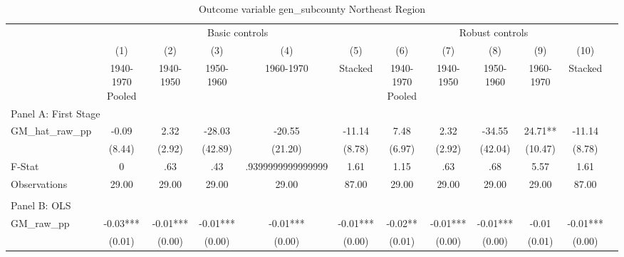  \begin{table}[htbp]\centering {} \begin{threeparttable} \caption{Outcome variable gen\_subcounty Northeast Region} \begin{tabular}{l*{11}{c}} \toprule
          &\multicolumn{5}{c}{Basic controls}                                   &\multicolumn{5}{c}{Robust controls}                                  \\\cmidrule(lr){2-6}\cmidrule(lr){7-11}
          &\multicolumn{1}{c}{(1)}&\multicolumn{1}{c}{(2)}&\multicolumn{1}{c}{(3)}&\multicolumn{1}{c}{(4)}&\multicolumn{1}{c}{(5)}&\multicolumn{1}{c}{(6)}&\multicolumn{1}{c}{(7)}&\multicolumn{1}{c}{(8)}&\multicolumn{1}{c}{(9)}&\multicolumn{1}{c}{(10)}\\
          &\multicolumn{1}{c}{1940-1970 Pooled}&\multicolumn{1}{c}{1940-1950}&\multicolumn{1}{c}{1950-1960}&\multicolumn{1}{c}{1960-1970}&\multicolumn{1}{c}{Stacked}&\multicolumn{1}{c}{1940-1970 Pooled}&\multicolumn{1}{c}{1940-1950}&\multicolumn{1}{c}{1950-1960}&\multicolumn{1}{c}{1960-1970}&\multicolumn{1}{c}{Stacked}\\
\cmidrule(lr){1-11}
\multicolumn{10}{l}{Panel A: First Stage}\\
\cmidrule(lr){1-11}
GM\_hat\_raw\_pp&     -0.09   &      2.32   &    -28.03   &    -20.55   &    -11.14   &      7.48   &      2.32   &    -34.55   &     24.71** &    -11.14   \\
          &    (8.44)   &    (2.92)   &   (42.89)   &   (21.20)   &    (8.78)   &    (6.97)   &    (2.92)   &   (42.04)   &   (10.47)   &    (8.78)   \\
\midrule
F-Stat    &         0   &       .63   &       .43   &.9399999999999999   &      1.61   &      1.15   &       .63   &       .68   &      5.57   &      1.61   \\
Observations&     29.00   &     29.00   &     29.00   &     29.00   &     87.00   &     29.00   &     29.00   &     29.00   &     29.00   &     87.00   \\
\cmidrule[\heavyrulewidth](lr){1-11} \\ \cmidrule[\heavyrulewidth](lr){1-11}
\multicolumn{10}{l}{Panel B: OLS}\\
\cmidrule(lr){1-11}
GM\_raw\_pp &     -0.03***&     -0.01***&     -0.01***&     -0.01***&     -0.01***&     -0.02** &     -0.01***&     -0.01***&     -0.01   &     -0.01***\\
          &    (0.01)   &    (0.00)   &    (0.00)   &    (0.00)   &    (0.00)   &    (0.01)   &    (0.00)   &    (0.00)   &    (0.01)   &    (0.00)   \\

\end{tabular}
\end{threeparttable}
\end{table}
